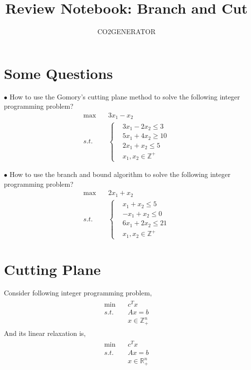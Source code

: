 \documentclass{article}
\title {Review Notebook: Branch and Cut}
\author{CO2GENERATOR}
\begin{document}
\maketitle 
\allowdisplaybreaks[4]

\section{Some Questions}

\noindent $\bullet$ How to use the Gomory's cutting plane method to solve the following integer programming problem?
\begin{align}
	\max \quad & 3x_1 - x_2 \\
	s.t. \quad & \left\{
	\begin{aligned}
		& 3x_1 - 2x_2 \leq 3 \\
		& 5x_1 + 4x_2 \geq 10 \\
		& 2x_1 + x_2 \leq 5 \\
		& x_1, x_2 \in \mathbb{Z}^+
	\end{aligned}\right.
\end{align}

\noindent $\bullet$ How to use the branch and bound algorithm to solve the following integer programming problem?
\begin{align}
	\max \quad & 2x_1 + x_2 \\
	s.t. \quad & \left\{
	\begin{aligned}
		& x_1 + x_2 \leq 5 \\
		& -x_1 + x_2 \leq 0 \\
		& 6x_1 + 2x_2 \leq 21 \\
		& x_1, x_2 \in \mathbb{Z}^+
	\end{aligned}\right.
\end{align}

\section{Cutting Plane}

Consider following integer programming problem,
\begin{align}
\label{problem:ip}
\begin{aligned}
\min \quad & c^Tx \\
s.t. \quad & Ax = b \\
& x \in \mathbb{Z}_+^n
\end{aligned}
\end{align}
And its linear relaxation is,
\begin{align}
\label{linear-relaxation}
\begin{aligned}
\min \quad & c^Tx \\
s.t. \quad & Ax = b \\
& x \in \mathbb{R}_+^n
\end{aligned}
\end{align}
\end{document}
